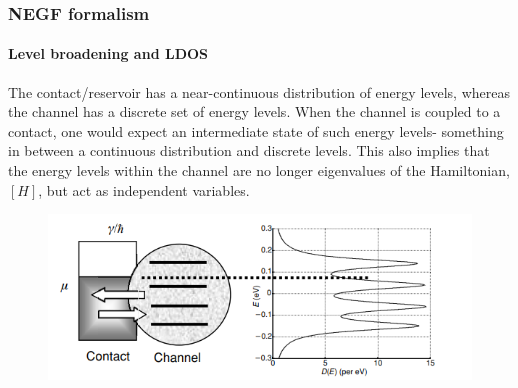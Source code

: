 \documentclass{beamer}
\begin{document}
{

    \begin{frame}
        \frametitle{NEGF formalism}
        \framesubtitle{Level broadening and LDOS}
        \scriptsize

\vspace{24pt}

The contact/reservoir has a near-continuous distribution of energy levels, whereas the channel has a discrete set of energy levels. When the channel is coupled to a contact, one would expect an intermediate state of such energy levels- something in between a continuous distribution and discrete levels. This also implies that the energy levels within the channel are no longer eigenvalues of the Hamiltonian, $[H]$, but act as independent variables. \par 

\begin{figure}[!htbp]
\centering
\includegraphics[scale=0.4]{level_broad.png}
\end{figure}

    \end{frame}
}
\end{document}
